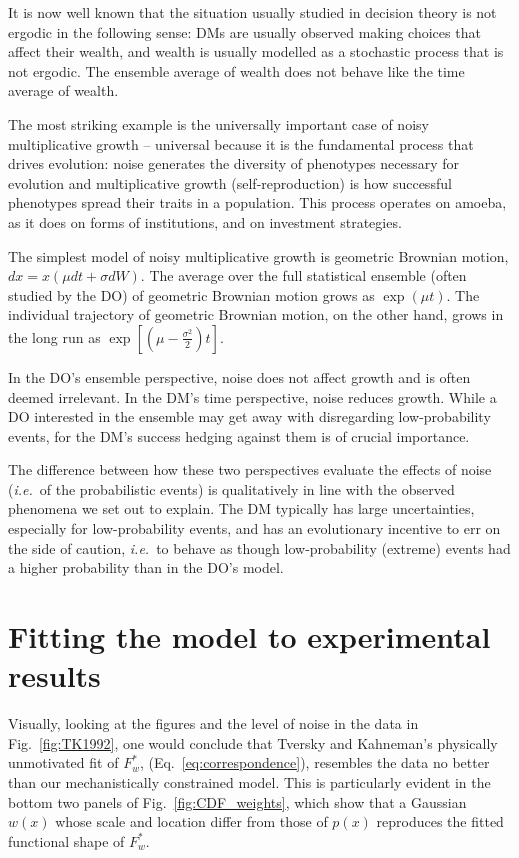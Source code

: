 \documentclass[a4paper, 12pt]{article}
\newcommand{\eref}[1]{(Eq.~\ref{eq:#1})}
\newcommand{\fref}[1]{Fig.~\ref{fig:#1}}
\newcommand{\seclabel}[1]{\label{sec:#1}}
\newcommand{\ie}{{\it i.e.}\ }
\begin{document}
It is now well known that the situation usually studied in decision theory is not ergodic in the following sense: DMs are usually observed making choices that affect their wealth, and wealth is usually modelled as a stochastic process that is not ergodic. The ensemble average of wealth does not behave like the time average of wealth.

The most striking example is the universally important case of noisy multiplicative growth -- universal because it is the fundamental process that drives evolution: noise generates the diversity of phenotypes necessary for evolution and multiplicative growth (self-reproduction) is how successful phenotypes spread their traits in a population. This process operates on amoeba, as it does on forms of institutions, and on investment strategies.

The simplest model of noisy multiplicative growth is geometric Brownian motion, $dx=x(\mu dt+\sigma dW)$. The average over the full statistical ensemble (often studied by the DO) of geometric Brownian motion grows as $\exp(\mu t)$. The individual trajectory of geometric Brownian motion, on the other hand, grows in the long run as $\exp[(\mu-\frac{\sigma^2}{2})t]$.

In the DO's ensemble perspective, noise does not affect growth and is often deemed irrelevant. In the DM's time perspective, noise reduces growth. While a DO interested in the ensemble may get away with disregarding low-probability events, for the DM's success hedging against them is of crucial importance.

The difference between how these two perspectives evaluate the effects of noise (\ie of the probabilistic events) is qualitatively in line with the observed phenomena we set out to explain. The DM typically has large uncertainties, especially for low-probability events, and has an evolutionary incentive to err on the side of caution, \ie to behave as though low-probability (extreme) events had a higher probability than in the DO's model.


\section{Fitting the model to experimental results \seclabel{Fitting_the}}

Visually, looking at the figures and the level of noise in the data in \fref{TK1992}, one would conclude that Tversky and Kahneman's physically unmotivated fit of $F^*_w$, \eref{correspondence}, resembles the data no better than our mechanistically constrained model. This is particularly evident in the bottom two panels of \fref{CDF_weights}, which show that a Gaussian $w(x)$ whose scale and location differ from those of $p(x)$ reproduces the fitted functional shape of $F^*_w$.
\end{document}
